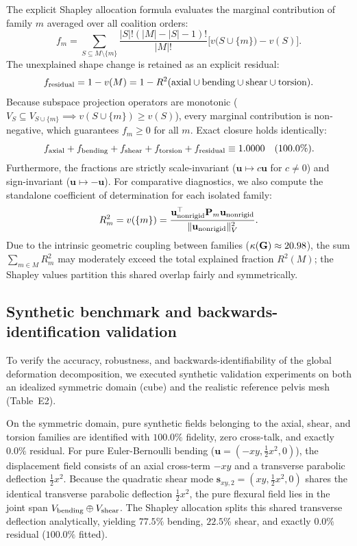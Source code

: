 \documentclass[11pt]{article}
\begin{document}
The explicit Shapley allocation formula evaluates the marginal contribution of family $m$ averaged over all coalition orders:
\begin{equation}
f_m = \sum_{S \subseteq M \setminus \{m\}} \frac{|S|!(|M| - |S| - 1)!}{|M|!} \Big[ v\big(S \cup \{m\}\big) - v(S) \Big].
\label{eq:shapley-formula}
\end{equation}
The unexplained shape change is retained as an explicit residual:
\begin{equation}
f_{\rm residual} = 1 - v(M) = 1 - R^2(\text{axial} \cup \text{bending} \cup \text{shear} \cup \text{torsion}).
\end{equation}
Because subspace projection operators are monotonic ($V_S \subseteq V_{S \cup \{m\}} \implies v(S \cup \{m\}) \ge v(S)$), every marginal contribution is non-negative, which guarantees $f_m \ge 0$ for all $m$.
Exact closure holds identically:
\begin{equation}
f_{\rm axial} + f_{\rm bending} + f_{\rm shear} + f_{\rm torsion} + f_{\rm residual} \equiv 1.0000 \quad (100.0\%).
\end{equation}
Furthermore, the fractions are strictly scale-invariant ($\mathbf u \mapsto c\mathbf u$ for $c \ne 0$) and sign-invariant ($\mathbf u \mapsto -\mathbf u$).
For comparative diagnostics, we also compute the standalone coefficient of determination for each isolated family:
\begin{equation}
R^2_m = v(\{m\}) = \frac{\mathbf u_{\rm nonrigid}^\top \mathbf P_m \mathbf u_{\rm nonrigid}}{\|\mathbf u_{\rm nonrigid}\|_V^2}.
\end{equation}
Due to the intrinsic geometric coupling between families ($\kappa(\mathbf G) \approx 20.98$), the sum $\sum_{m \in M} R^2_m$ may moderately exceed the total explained fraction $R^2(M)$; the Shapley values partition this shared overlap fairly and symmetrically.

\subsection{Synthetic benchmark and backwards-identification validation}
To verify the accuracy, robustness, and backwards-identifiability of the global deformation decomposition, we executed synthetic validation experiments on both an idealized symmetric domain (cube) and the realistic reference pelvis mesh (Table~E2).

On the symmetric domain, pure synthetic fields belonging to the axial, shear, and torsion families are identified with $100.0\%$ fidelity, zero cross-talk, and exactly $0.0\%$ residual.
For pure Euler-Bernoulli bending ($\mathbf u = (-xy, \tfrac{1}{2}x^2, 0)$), the displacement field consists of an axial cross-term $-xy$ and a transverse parabolic deflection $\tfrac{1}{2}x^2$.
Because the quadratic shear mode $\mathbf s_{xy,2} = (xy, \tfrac{1}{2}x^2, 0)$ shares the identical transverse parabolic deflection $\tfrac{1}{2}x^2$, the pure flexural field lies in the joint span $V_{\rm bending} \oplus V_{\rm shear}$.
The Shapley allocation splits this shared transverse deflection analytically, yielding $77.5\%$ bending, $22.5\%$ shear, and exactly $0.0\%$ residual ($100.0\%$ fitted).
\end{document}
